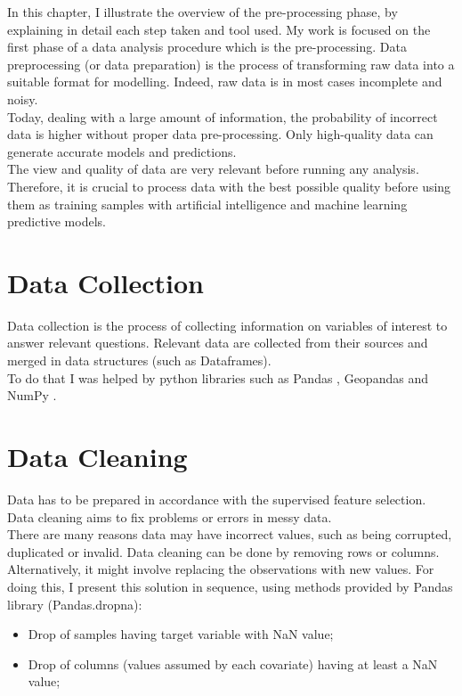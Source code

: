 In this chapter, I illustrate the overview of the pre-processing phase, by explaining in detail each step taken and tool used.
My work is focused on the first phase of a data analysis procedure which is the pre-processing.
Data preprocessing (or data preparation) is the process of transforming raw data into a suitable format for modelling. 
Indeed, raw data is in most cases incomplete and noisy.\\
Today, dealing with a large amount of information, the probability of incorrect data is higher without proper data pre-processing.
Only high-quality data can generate accurate models and predictions. \\
The view and quality of data are very relevant before running any analysis.\\
Therefore, it is crucial to process data with the best possible quality before using them as training samples with artificial intelligence and machine learning predictive models.\par

\section{Data Collection}
Data collection is the process of collecting information on variables of interest to answer relevant questions. \newline
Relevant data are collected from their sources and merged in data structures (such as Dataframes). \\
To do that I was helped by python libraries such as Pandas \cite{pandas}, Geopandas \cite{geopandas} and NumPy \cite{numpy}.
\section{Data Cleaning}
\label{sec:Data cleaning}
Data has to be prepared in accordance with the supervised feature selection.
Data cleaning aims to fix problems or errors in messy data.\\ There are many reasons data may have incorrect values, such as being corrupted, duplicated or invalid. \newline
Data cleaning can be done by removing rows or columns. Alternatively, it might involve replacing the observations with new values. \newline
For doing this, I present this solution in sequence, using methods provided by Pandas library (Pandas.dropna):
\begin{itemize}
\item Drop of samples having target variable with NaN value;
\item Drop of columns (values assumed by each covariate) having at least a NaN value;
\end{itemize}
